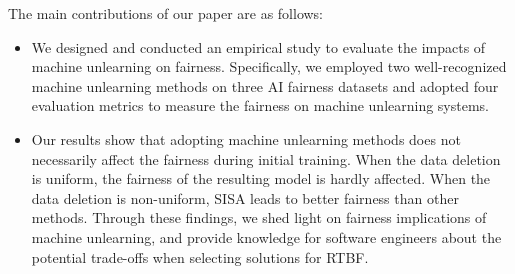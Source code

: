 The main contributions of our paper are as follows:
\begin{itemize}
    \item We designed and conducted an empirical study to evaluate the impacts of machine unlearning on fairness. Specifically, we employed two well-recognized machine unlearning methods on three AI fairness datasets and adopted four evaluation metrics to measure the fairness on machine unlearning systems. 
    
    \item Our results show that adopting machine unlearning methods does not necessarily affect the fairness during initial training. When the data deletion is uniform, the fairness of the resulting model is hardly affected. When the data deletion is non-uniform, SISA leads to better fairness than other methods. Through these findings, we shed light on fairness implications of machine unlearning, and provide knowledge for software engineers about the potential trade-offs when selecting solutions for RTBF.
    
\end{itemize}

